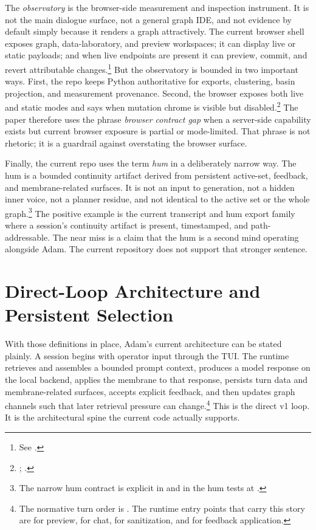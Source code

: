 \documentclass[10pt]{article}
\begin{document}
The \emph{observatory} is the browser-side measurement and inspection instrument. It is not the main dialogue surface, not a general graph IDE, and not evidence by default simply because it renders a graph attractively. The current browser shell exposes graph, data-laboratory, and preview workspaces; it can display live or static payloads; and when live endpoints are present it can preview, commit, and revert attributable changes.\footnote{See .} But the observatory is bounded in two important ways. First, the repo keeps Python authoritative for exports, clustering, basin projection, and measurement provenance. Second, the browser exposes both live and static modes and says when mutation chrome is visible but disabled.\footnote{; .} The paper therefore uses the phrase \emph{browser contract gap} when a server-side capability exists but current browser exposure is partial or mode-limited. That phrase is not rhetoric; it is a guardrail against overstating the browser surface.

Finally, the current repo uses the term \emph{hum} in a deliberately narrow way. The hum is a bounded continuity artifact derived from persistent active-set, feedback, and membrane-related surfaces. It is not an input to generation, not a hidden inner voice, not a planner residue, and not identical to the active set or the whole graph.\footnote{The narrow hum contract is explicit in  and in the hum tests at .} The positive example is the current transcript and hum export family where a session's continuity artifact is present, timestamped, and path-addressable. The near miss is a claim that the hum is a second mind operating alongside Adam. The current repository does not support that stronger sentence.

\section{Direct-Loop Architecture and Persistent Selection}

With those definitions in place, Adam's current architecture can be stated plainly. A session begins with operator input through the TUI. The runtime retrieves and assembles a bounded prompt context, produces a model response on the local backend, applies the membrane to that response, persists turn data and membrane-related surfaces, accepts explicit feedback, and then updates graph channels such that later retrieval pressure can change.\footnote{The normative turn order is . The runtime entry points that carry this story are  for preview,  for chat,  for sanitization, and  for feedback application.} This is the direct v1 loop. It is the architectural spine the current code actually supports.
\end{document}
